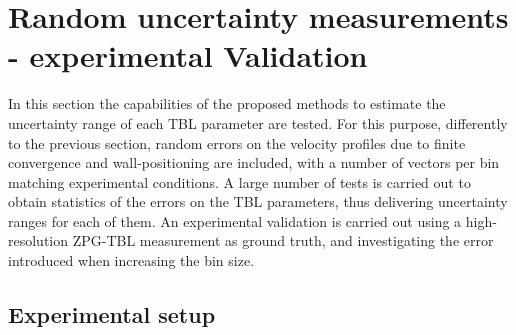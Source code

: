 \begin{table}
\centering
\caption{\centering Reference TBL parameters for DNS, composite profile and experiments.}
\label{tab:1}       %
\end{table}

\section{{Random uncertainty measurements - }experimental Validation} \label{s:validation}

{In this section the capabilities of the proposed methods to estimate the uncertainty range of each TBL parameter are tested. For this purpose, differently to the previous section, random errors on the velocity profiles due to finite convergence and wall-positioning are included, with a number of vectors per bin matching experimental conditions. A large number of tests is carried out to obtain statistics of the errors on the TBL parameters, thus delivering uncertainty ranges for each of them. An experimental validation is carried out using a high-resolution ZPG-TBL measurement as ground truth, and investigating the error introduced when increasing the bin size.}

\subsection{Experimental setup}

